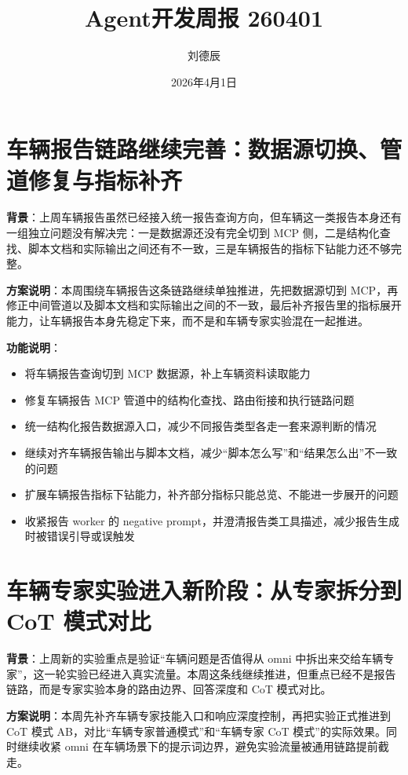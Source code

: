 \documentclass[UTF8]{ctexart}
\title{Agent开发周报 260401}
\author{刘德辰}
\date{2026年4月1日}
\begin{document}
\maketitle

\section{车辆报告链路继续完善：数据源切换、管道修复与指标补齐}

\textbf{背景}：上周车辆报告虽然已经接入统一报告查询方向，但车辆这一类报告本身还有一组独立问题没有解决完：一是数据源还没有完全切到 MCP 侧，二是结构化查找、脚本文档和实际输出之间还有不一致，三是车辆报告的指标下钻能力还不够完整。

\textbf{方案说明}：本周围绕车辆报告这条链路继续单独推进，先把数据源切到 MCP，再修正中间管道以及脚本文档和实际输出之间的不一致，最后补齐报告里的指标展开能力，让车辆报告本身先稳定下来，而不是和车辆专家实验混在一起推进。

\textbf{功能说明}：
\begin{itemize}
\item 将车辆报告查询切到 MCP 数据源，补上车辆资料读取能力
\item 修复车辆报告 MCP 管道中的结构化查找、路由衔接和执行链路问题
\item 统一结构化报告数据源入口，减少不同报告类型各走一套来源判断的情况
\item 继续对齐车辆报告输出与脚本文档，减少“脚本怎么写”和“结果怎么出”不一致的问题
\item 扩展车辆报告指标下钻能力，补齐部分指标只能总览、不能进一步展开的问题
\item 收紧报告 worker 的 negative prompt，并澄清报告类工具描述，减少报告生成时被错误引导或误触发
\end{itemize}

\section{车辆专家实验进入新阶段：从专家拆分到 CoT 模式对比}

\textbf{背景}：上周新的实验重点是验证“车辆问题是否值得从 omni 中拆出来交给车辆专家”，这一轮实验已经进入真实流量。本周这条线继续推进，但重点已经不是报告链路，而是专家实验本身的路由边界、回答深度和 CoT 模式对比。

\textbf{方案说明}：本周先补齐车辆专家技能入口和响应深度控制，再把实验正式推进到 CoT 模式 AB，对比“车辆专家普通模式”和“车辆专家 CoT 模式”的实际效果。同时继续收紧 omni 在车辆场景下的提示词边界，避免实验流量被通用链路提前截走。
\end{document}
